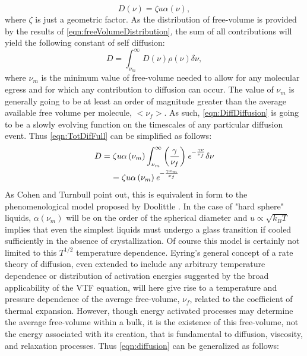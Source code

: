 \begin{equation}
	D\left(\nu\right)=\zeta u\alpha\left(\nu\right),
	\label{eqn:DiffDiffusion}
\end{equation}
where $\zeta$ is just a geometric factor.  As the distribution of free-volume is provided by the results of \eqn\nolinebreak \ref{eqn:freeVolumeDistribution}, the sum of all contributions will yield the following constant of self diffusion: 
\begin{equation}
	D=\int_{\nu_{m}}^{\infty}D\left(\nu\right)\rho\left(\nu\right)\delta\nu,
	\label{eqn:TotDifFull}
\end{equation}
where $\nu_{m}$ is the minimum value of free-volume needed to allow for any molecular egress and for which any contribution to diffusion can occur.  The value of $\nu_{m}$ is generally going to be at least an order of magnitude greater than the average available free volume per molecule, $<\nu_f>$.  As such, \eqn\nolinebreak \ref{eqn:DiffDiffusion} is going to be a slowly evolving function on the timescales of any particular diffusion event.  Thus \eqn\nolinebreak \ref{eqn:TotDifFull} can be simplified as follows:
\begin{equation}
	\begin{split}
		&D=\zeta u\alpha\left(\nu_{m}\right)\int_{\nu_{m}}^{\infty}\left(\frac{\gamma}{\nu_f}\right)\textit{e}^{-\frac{\gamma\nu}{\nu_f}}\delta\nu\\
		&\;\;\;\;\;\;\;=\zeta u\alpha\left(\nu_{m}\right)\textit{e}^{-\frac{\gamma \nu_{m}}{\nu_f}}
	\end{split}
	\label{eqn:diffusion}
\end{equation}
As Cohen and Turnbull point out, this is equivalent in form to the phenomenological model proposed by Doolittle \nolinebreak\cite{Doolittle}.  In the case of "hard sphere" liquids, $\alpha\left(\nu_{m}\right)$ will be on the order of the spherical diameter and $u\propto\sqrt{k_B T}$ implies that even the simplest liquids must undergo a glass transition if cooled sufficiently in the absence of crystallization.  Of course this model is certainly not limited to this $T^{1/2}$ temperature dependence.  Eyring's general concept of a rate theory of diffusion, even extended to include any arbitrary temperature dependence or distribution of activation energies suggested by the broad applicability of the VTF equation, will here give rise to a temperature and pressure dependence of the average free-volume, $\nu_f$, related to the coefficient of thermal expansion.  However, though energy activated processes may determine the average free-volume within a bulk, it is the existence of this free-volume, not the energy associated with its creation, that is fundamental to diffusion, viscosity, and relaxation processes. Thus \eqn\nolinebreak \ref{eqn:diffusion} can be generalized as follows:
